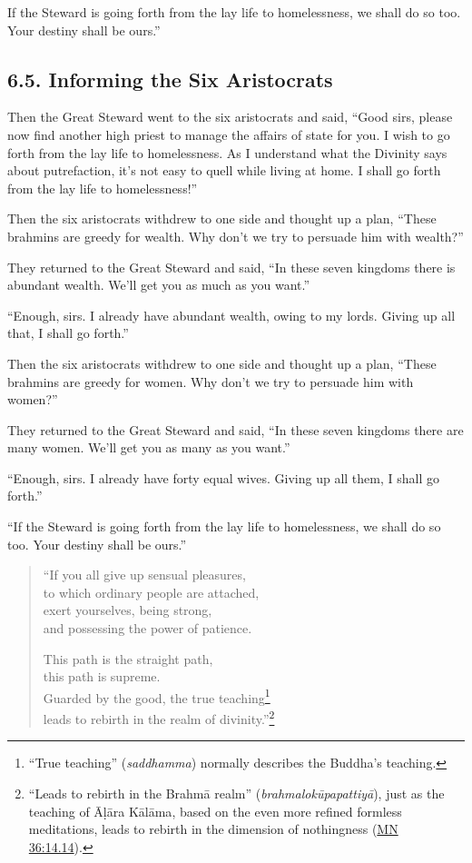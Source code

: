 \documentclass[12pt,openany]{book}%
\begin{document}
If the Steward is going forth from the lay life to homelessness, we shall do so too. Your destiny shall be ours.” 

\subsection*{6.5. Informing the Six Aristocrats }

Then the Great Steward went to the six aristocrats and said, “Good sirs, please now find another high priest to manage the affairs of state for you. I wish to go forth from the lay life to homelessness. As I understand what the Divinity says about putrefaction, it’s not easy to quell while living at home. I shall go forth from the lay life to homelessness!” 

Then the six aristocrats withdrew to one side and thought up a plan, “These brahmins are greedy for wealth. Why don’t we try to persuade him with wealth?” 

They returned to the Great Steward and said, “In these seven kingdoms there is abundant wealth. We’ll get you as much as you want.” 

“Enough, sirs. I already have abundant wealth, owing to my lords. Giving up all that, I shall go forth.” 

Then the six aristocrats withdrew to one side and thought up a plan, “These brahmins are greedy for women. Why don’t we try to persuade him with women?” 

They returned to the Great Steward and said, “In these seven kingdoms there are many women. We’ll get you as many as you want.” 

“Enough, sirs. I already have forty equal wives. Giving up all them, I shall go forth.” 

“If the Steward is going forth from the lay life to homelessness, we shall do so too. Your destiny shall be ours.” 

\begin{verse}%
“If you all give up sensual pleasures, \\
to which ordinary people are attached, \\
exert yourselves, being strong, \\
and possessing the power of patience. 

This path is the straight path, \\
this path is supreme. \\
Guarded by the good, the true teaching\footnote{“True teaching” (\textit{saddhamma}) normally describes the Buddha’s teaching. } \\
leads to rebirth in the realm of divinity.”\footnote{“Leads to rebirth in the \textsanskrit{Brahmā} realm” (\textit{\textsanskrit{brahmalokūpapattiyā}}), just as the teaching of \textsanskrit{Āḷāra} \textsanskrit{Kālāma}, based on the even more refined formless meditations, leads to rebirth in the dimension of nothingness (\href{https://suttacentral.net/mn36/en/sujato\#14.14}{MN 36:14.14}). } 

%
\end{verse}
\end{document}
